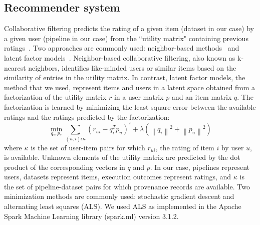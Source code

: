 \documentclass[conference]{IEEEtran}
\begin{document}
\subsection{Recommender system}

Collaborative filtering predicts the rating of a given item (dataset in our
case) by a given user (pipeline in our case) from the ``utility
matrix" containing previous ratings~\cite{rajaraman2011mining}.
Two  approaches are commonly used: neighbor-based
methods~\cite{koren2015advances} and latent factor
models~\cite{koren2009matrix,bokde2015matrix}. Neighbor-based collaborative
filtering, also known as k-nearest neighbors, identifies
like-minded users or similar items based on the similarity of entries in
the utility matrix. In contrast, latent factor models, the method that we used, represent items and
users in a latent space obtained from a factorization of the
utility matrix $r$ in a user matrix $p$ and an item matrix $q$. The
factorization is learned by minimizing the least square error between the
available ratings and the ratings predicted by the factorization:
\begin{equation} \tag{1}
   \min_{q_{*},p_{*}} \sum_{(u,i) \epsilon \kappa }  (r_{ui}-q_{i}^{T}p_{u})^{^2}+\lambda \left ( \left \| q_{i}\right \|^2+\left \| p_{u}\right \|^2 \right )            \label{eq}
\end{equation}
where $\kappa$ is the set of user-item pairs for which $r_{ui}$, the rating of item
$i$ by user $u$, is available. Unknown elements of the utility matrix are
predicted by the dot product of the corresponding vectors in $q$ and $p$.
In our case, pipelines represent users, datasets represent items, execution
outcomes represent ratings, and $\kappa$ is the set of pipeline-dataset
pairs for which provenance records are available. Two minimization methods are
commonly used: stochastic gradient descent and alternating least squares
(ALS). We used ALS as implemented in the
Apache Spark Machine Learning library (spark.ml) version 3.1.2. 


\end{document}

